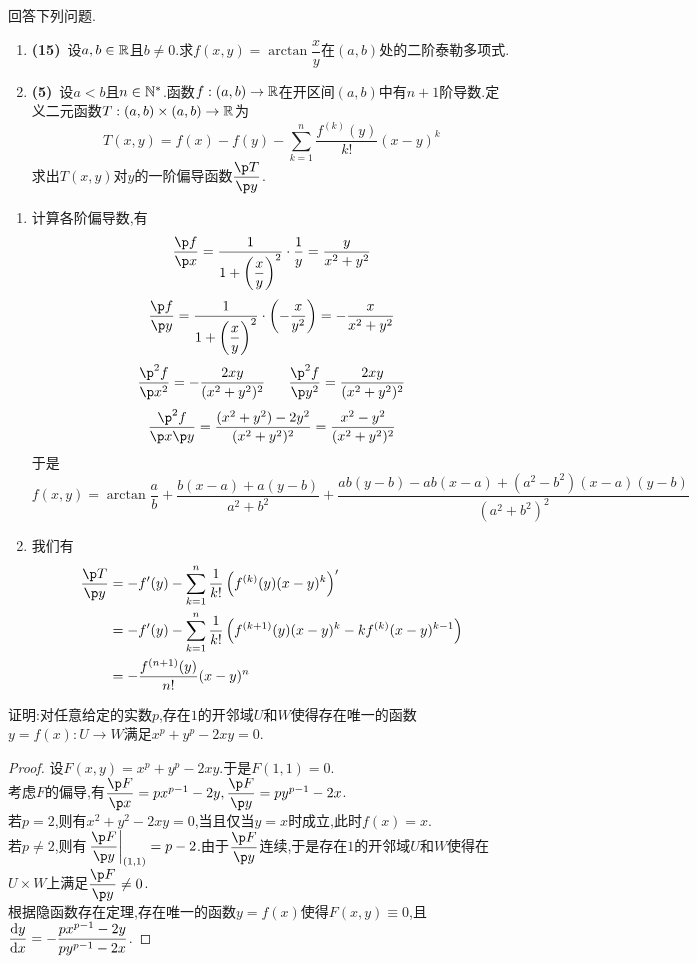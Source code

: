 \documentclass{ctexart}
\begin{document}
\begin{problem}[3.(20\songti{分})]
    回答下列问题.
    \begin{enumerate}[label=\textbf{(\arabic*)},leftmargin=*]
        \item \textbf{(15)}\ 设$a,b\in\mathbb{R}$且$b\neq0$.求$f(x,y)=\arctan\dfrac xy$在$(a,b)$处的二阶泰勒多项式.
        \item \textbf{(5)}\ 设$a<b$且$n\in\mathbb{N}^*$.函数$f:(a,b)\to\mathbb{R}$在开区间$(a,b)$中有$n+1$阶导数.定义二元函数$T:(a,b)\times(a,b)\to\mathbb{R}$为
            \[T(x,y)=f(x)-f(y)-\sum_{k=1}^n\dfrac{f^{(k)}(y)}{k!}(x-y)^k\]
            求出$T(x,y)$对$y$的一阶偏导函数$\dfrac{\p T}{\p y}$.
    \end{enumerate}
\end{problem}
\begin{solution}
    \begin{enumerate}[label=\textbf{(\arabic*)},leftmargin=*]
        \item 计算各阶偏导数,有
            \[\dfrac{\p f}{\p x}=\dfrac{1}{1+\left(\dfrac xy\right)^2}\cdot\dfrac1y=\dfrac{y}{x^2+y^2}\]
            \[\dfrac{\p f}{\p y}=\dfrac{1}{1+\left(\dfrac xy\right)^2}\cdot\left(-\dfrac{x}{y^2}\right)=-\dfrac{x}{x^2+y^2}\]
            \[\dfrac{\p^2f}{\p x^2}=-\dfrac{2xy}{(x^2+y^2)^2}\ \ \ \ \ \dfrac{\p^2f}{\p y^2}=\dfrac{2xy}{(x^2+y^2)^2}\]
            \[\dfrac{\p^2f}{\p x\p y}=\dfrac{(x^2+y^2)-2y^2}{(x^2+y^2)^2}=\dfrac{x^2-y^2}{(x^2+y^2)^2}\]
            于是\[f(x,y)=\arctan\dfrac ab+\dfrac{b(x-a)+a(y-b)}{a^2+b^2}+\dfrac{ab(y-b)-ab(x-a)+(a^2-b^2)(x-a)(y-b)}{(a^2+b^2)^2}\]
        \item 我们有
            \[\begin{aligned}
                \dfrac{\p T}{\p y}
                &= -f'(y)-\sum_{k=1}^n\dfrac{1}{k!}\left(f^{(k)}(y)(x-y)^k\right)' \\
                &= -f'(y)-\sum_{k=1}^n\dfrac{1}{k!}\left(f^{(k+1)}(y)(x-y)^k-kf^{(k)}(x-y)^{k-1}\right) \\
                &= -\dfrac{f^{(n+1)}(y)}{n!}(x-y)^n
            \end{aligned}\]
    \end{enumerate}
\end{solution}
\begin{problem}[4.(10\songti{分})]
    证明:对任意给定的实数$p$,存在$1$的开邻域$U$和$W$使得存在唯一的函数$y=f(x):U\to W$满足$x^p+y^p-2xy=0$.
\end{problem}
\begin{proof}
    设$F(x,y)=x^p+y^p-2xy$.于是$F(1,1)=0$.\\
    考虑$F$的偏导,有$\dfrac{\p F}{\p x}=px^{p-1}-2y,\dfrac{\p F}{\p y}=py^{p-1}-2x$.\\
    若$p=2$,则有$x^2+y^2-2xy=0$,当且仅当$y=x$时成立,此时$f(x)=x$.\\
    若$p\neq 2$,则有$\left.\dfrac{\p F}{\p y}\right|_{(1,1)}=p-2$.由于$\dfrac{\p F}{\p y}$连续,于是存在$1$的开邻域$U$和$W$使得在$U\times W$上满足$\dfrac{\p F}{\p y}\neq0$.\\
    根据隐函数存在定理,存在唯一的函数$y=f(x)$使得$F(x,y)\equiv0$,且$\dfrac{\mathrm{d} y}{\mathrm{d} x}=-\dfrac{px^{p-1}-2y}{py^{p-1}-2x}$.
\end{proof}
\end{document}

